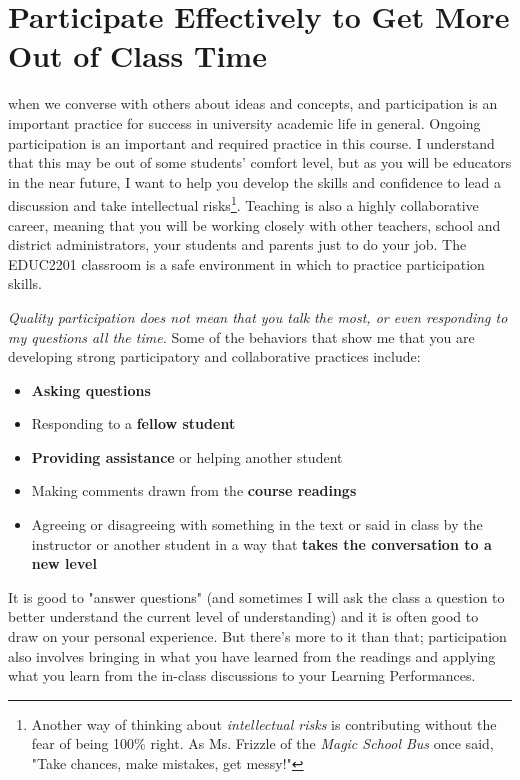 \section{Participate Effectively to Get More Out of Class Time}
 when we converse with others about ideas and concepts, and participation is an important practice for success in university academic life in general. Ongoing participation is an important and required practice in this course. I understand that this may be out of some students' comfort level, but as you will be educators in the near future, I want to help you develop the skills and confidence to lead a discussion and take intellectual risks\footnote{Another way of thinking about \textit{intellectual risks} is contributing without the fear of being 100\% right. As Ms. Frizzle of the \textit{Magic School Bus} once said, "Take chances, make mistakes, get messy!"}. Teaching is also a highly collaborative career, meaning that you will be working closely with other teachers, school and district administrators, your students and parents just to do your job. The EDUC2201 classroom is a safe environment in which to practice participation skills.

\emph{Quality participation does not mean that you talk the most, or even responding to my questions all the time.} Some of the behaviors that show me that you are developing strong participatory and collaborative practices include:
\begin{itemize}
	\itemsep-0.5em
	\item \textbf{Asking questions}
	\item Responding to a \textbf{fellow student}
	\item \textbf{Providing assistance} or helping another student
	\item Making comments drawn from the \textbf{course readings}
	\item Agreeing or disagreeing with something in the text or said in class by the instructor or another student in a way that \textbf{takes the conversation to a new level}
\end{itemize}
It is good to "answer questions" (and sometimes I will ask the class a question to better understand the current level of understanding) and it is often good to draw on your personal experience. But there's more to it than that; participation also involves bringing in what you have learned from the readings and applying what you learn from the in-class discussions to your Learning Performances.
